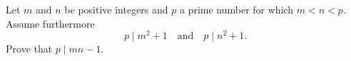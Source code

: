 Let $m$ and $n$ be positive integers and $p$ a prime number for which $m<n<p$.
Assume furthermore 
$$p \mid m^2+1\quad\text{and}\quad p\mid n^2+1.$$
Prove that $p \mid mn -1.$
